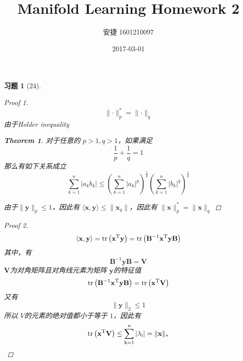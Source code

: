 \documentclass[a4paper, UTF8]{ctexart}
\title{Manifold Learning Homework 2}
\date{2017-03-01}
\author{安捷 1601210097}
\newtheorem*{exercise}{\textbf{习题}}
\newtheorem*{theorem}{Theorem}
\begin{document}
\maketitle
\begin{exercise}[24]
  \begin{proof}[Proof 1]
    \begin{equation*}
      \lVert \cdot \rVert_p^* = \lVert \cdot \rVert_q
    \end{equation*}
    由于Holder inequality
    \begin{theorem}
      对于任意的 $p > 1, q>1$，如果满足
      \begin{equation*}
        \frac{1}{p} + \frac{1}{q} = 1
      \end{equation*}
      那么有如下关系成立
      \begin{equation*}
        \sum_{k=1}^n |a_k b_k| \le \left( \sum_{k=1}^n |a_k|^p \right)^{\frac{1}{p}}\left( \sum_{k=1}^n |b_k|^q \right)^{\frac{1}{q}}
      \end{equation*}
    \end{theorem}
  由于$\lVert \mathbf{y}\rVert_p \le 1$，因此有 $\langle \mathbf{x}, \mathbf{y}\rangle \le \lVert \mathbf{x}_q \rVert$，因此有 $\lVert \mathbf{x} \rVert_p^* = \lVert \mathbf{x} \rVert_q$
  \end{proof}
  \begin{proof}[Proof 2]
    \begin{equation*}
      \langle \mathbf{x}, \mathbf{y} \rangle = \rm{tr} \left( \mathbf{x}^T \mathbf{y} \right) = \rm{tr} \left( \mathbf{B}^{-1}\mathbf{x}^T \mathbf{y} \mathbf{B} \right)
    \end{equation*}
    其中，有
    \begin{equation*}
      \mathbf{B}^{-1} \mathbf{y} \mathbf{B}=\mathbf{V}
    \end{equation*}
    $\mathbf{V}$为对角矩阵且对角线元素为矩阵 $\mathbf{y}$的特征值
    \begin{equation*}
      \rm{tr}\left( \mathbf{B}^{-1} \mathbf{x}^T \mathbf{y} \mathbf{B} \right) = \rm{tr} \left( \mathbf{x}^T \mathbf{V} \right)
    \end{equation*}
    又有
    \begin{equation*}
      \lVert \mathbf{y} \rVert_2 \le 1
    \end{equation*}
    所以 $V$的元素的绝对值都小于等于 $1$，因此有
    \begin{equation*}
      \rm{tr} \left( \mathbf{x}^T \mathbf{V} \right) \le \sum_{k=1}^n |\lambda_i| = \lVert \mathbf{x} \rVert_*

\end{equation*}
\end{proof}
\end{exercise}
\end{document}
